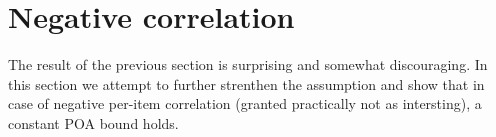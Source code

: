 \section{Negative correlation}
The result of the previous section is surprising and somewhat discouraging. In this section we attempt to further strenthen the assumption and show that in case of negative per-item correlation (granted practically not as intersting), a constant POA bound holds. 